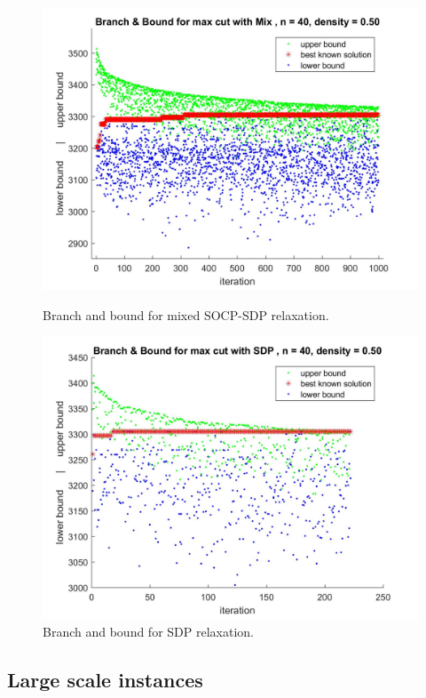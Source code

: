 \documentclass[12pt]{book}
\theoremstyle{definition}
\begin{document}
\begin{figure}
\centering 

\includegraphics[scale=0.27]{img/bnb_mix_n40_d50_1.jpg}
\caption[Branch and bound for mixed SOCP-SDP relaxation]{Branch and bound for mixed SOCP-SDP relaxation. }
\label{FigureBnb1mix}

\includegraphics[scale=0.27]{img/bnb_sdp_n40_d50_1.jpg}
\caption[Branch and bound for SDP relaxation]{Branch and bound for SDP relaxation. }
\label{Figurebnb1sdp}
\end{figure}


\subsection{Large scale instances}
\end{document}
